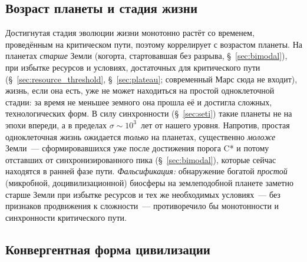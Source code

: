 \documentclass[12pt,a4paper]{article}
\begin{document}
\subsection{Возраст планеты и стадия жизни}
\label{sec:pred_planet_age}

Достигнутая стадия эволюции жизни монотонно растёт со временем, проведённым на критическом пути, поэтому коррелирует с возрастом планеты. На планетах \emph{старше} Земли (когорта, стартовавшая без разрыва, \S~\ref{sec:bimodal}), при избытке ресурсов и условиях, достаточных для критического пути (\S~\ref{sec:resource_threshold}, \S~\ref{sec:plateau}; современный Марс сюда не входит), жизнь, если она есть, уже не может находиться на простой одноклеточной стадии: за время не меньшее земного она прошла её и достигла сложных, технологических форм. В силу синхронности (\S~\ref{sec:seti}) такие планеты не на эпохи впереди, а в пределах $\sigma \sim 10^3$~лет от нашего уровня. Напротив, простая одноклеточная жизнь ожидается \emph{только} на планетах, существенно \emph{моложе} Земли~--- сформировавшихся уже после достижения порога C* и потому отставших от синхронизированного пика (\S~\ref{sec:bimodal}), которые сейчас находятся в ранней фазе пути. \emph{Фальсификация:} обнаружение богатой \emph{простой} (микробной, доцивилизационной) биосферы на землеподобной планете заметно старше Земли при избытке ресурсов и тех же необходимых условиях~--- без признаков продвижения к сложности~--- противоречило бы монотонности и синхронности критического пути.

\subsection{Конвергентная форма цивилизации}
\label{sec:pred_convergent_form}
\end{document}
